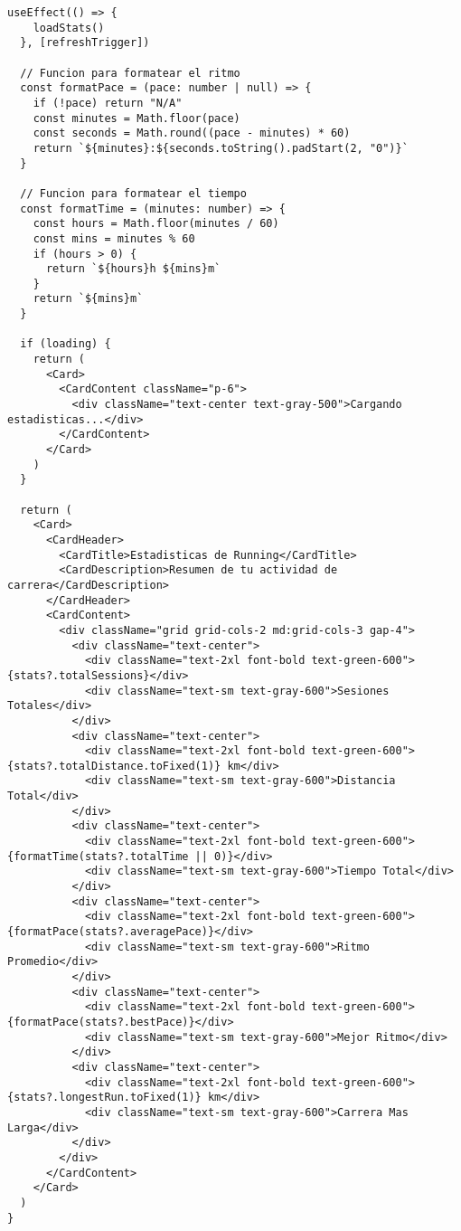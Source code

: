 \documentclass[12pt,a4paper]{article}
\begin{document}
\begin{lstlisting}[caption=components/running/running-stats.tsx - Logica de calculo]
  useEffect(() => {
    loadStats()
  }, [refreshTrigger])

  // Funcion para formatear el ritmo
  const formatPace = (pace: number | null) => {
    if (!pace) return "N/A"
    const minutes = Math.floor(pace)
    const seconds = Math.round((pace - minutes) * 60)
    return `${minutes}:${seconds.toString().padStart(2, "0")}`
  }

  // Funcion para formatear el tiempo
  const formatTime = (minutes: number) => {
    const hours = Math.floor(minutes / 60)
    const mins = minutes % 60
    if (hours > 0) {
      return `${hours}h ${mins}m`
    }
    return `${mins}m`
  }

  if (loading) {
    return (
      <Card>
        <CardContent className="p-6">
          <div className="text-center text-gray-500">Cargando estadisticas...</div>
        </CardContent>
      </Card>
    )
  }

  return (
    <Card>
      <CardHeader>
        <CardTitle>Estadisticas de Running</CardTitle>
        <CardDescription>Resumen de tu actividad de carrera</CardDescription>
      </CardHeader>
      <CardContent>
        <div className="grid grid-cols-2 md:grid-cols-3 gap-4">
          <div className="text-center">
            <div className="text-2xl font-bold text-green-600">{stats?.totalSessions}</div>
            <div className="text-sm text-gray-600">Sesiones Totales</div>
          </div>
          <div className="text-center">
            <div className="text-2xl font-bold text-green-600">{stats?.totalDistance.toFixed(1)} km</div>
            <div className="text-sm text-gray-600">Distancia Total</div>
          </div>
          <div className="text-center">
            <div className="text-2xl font-bold text-green-600">{formatTime(stats?.totalTime || 0)}</div>
            <div className="text-sm text-gray-600">Tiempo Total</div>
          </div>
          <div className="text-center">
            <div className="text-2xl font-bold text-green-600">{formatPace(stats?.averagePace)}</div>
            <div className="text-sm text-gray-600">Ritmo Promedio</div>
          </div>
          <div className="text-center">
            <div className="text-2xl font-bold text-green-600">{formatPace(stats?.bestPace)}</div>
            <div className="text-sm text-gray-600">Mejor Ritmo</div>
          </div>
          <div className="text-center">
            <div className="text-2xl font-bold text-green-600">{stats?.longestRun.toFixed(1)} km</div>
            <div className="text-sm text-gray-600">Carrera Mas Larga</div>
          </div>
        </div>
      </CardContent>
    </Card>
  )
}
\end{lstlisting}
\end{document}
